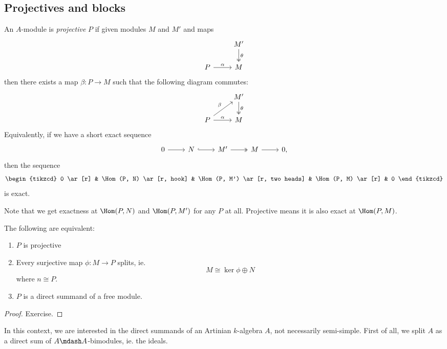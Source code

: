\documentclass[a4paper]{article}
\begin{document}
\subsection{Projectives and blocks}
\begin{defi}
  An $A$-module is \emph{projective} $P$ if given modules $M$ and $M'$ and maps
  \[
    \begin{tikzcd}
      & M'\ar[d, "\theta", two heads]\\
      P \ar[r, "\alpha"] & M
    \end{tikzcd}
  \]
  then there exists a map $\beta: P \to M$ such that the following diagram commutes:
  \[
    \begin{tikzcd}
      & M'\ar[d, "\theta", two heads]\\
      P \ar[r, "\alpha"] \ar[ur, "\beta"] & M
    \end{tikzcd}
  \]
  Equivalently, if we have a short exact sequence
  \[
    \begin{tikzcd}
      0 \ar[r] & N \ar[r, hook] & M' \ar[r, two heads] & M \ar[r] & 0,
    \end{tikzcd}
  \]
  then the sequence
  \[
    \begin{tikzcd}
      0 \ar[r] & \Hom(P, N) \ar[r, hook] & \Hom(P, M') \ar[r, two heads] & \Hom(P, M) \ar[r] & 0
    \end{tikzcd}
  \]
  is exact.
\end{defi}
Note that we get exactness at $\Hom(P, N)$ and $\Hom(P, M')$ for any $P$ at all. Projective means it is also exact at $\Hom(P, M)$.
\begin{lemma}
  The following are equivalent:
  \begin{enumerate}
    \item $P$ is projective
    \item Every surjective map $\phi: M \to P$ splits, ie.
      \[
        M \cong \ker \phi \oplus N
      \]
      where $n \cong P$.
    \item $P$ is a direct summand of a free module.
  \end{enumerate}
\end{lemma}

\begin{proof}
  Exercise. %
\end{proof}

In this context, we are interested in the direct summands of an Artinian $k$-algebra $A$, not necessarily semi-simple. First of all, we split $A$ as a direct sum of $A\mdash A$-bimodules, ie. the ideals.
\end{document}
